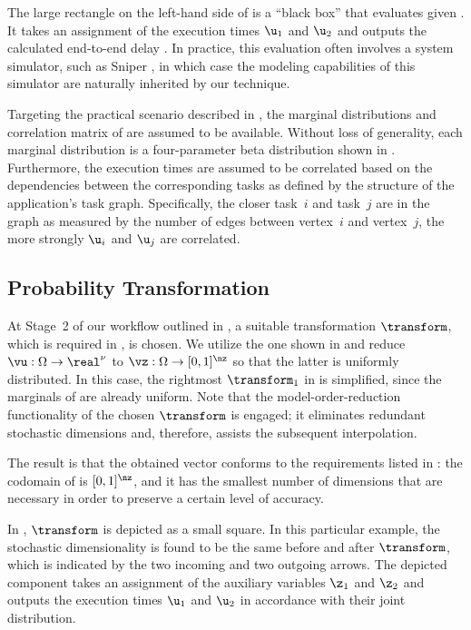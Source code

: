 The large rectangle on the left-hand side of  is a
``black box'' that evaluates \g given \vu. It takes an assignment of the
execution times $\u_1$ and $\u_2$ and outputs the calculated end-to-end delay
\g. In practice, this evaluation often involves a system simulator, such as
Sniper \cite{carlson2011}, in which case the modeling capabilities of this
simulator are naturally inherited by our technique.

Targeting the practical scenario described in , the
marginal distributions and correlation matrix of \vu are assumed to be
available. Without loss of generality, each marginal distribution is a
four-parameter beta distribution shown in . Furthermore,
the execution times are assumed to be correlated based on the dependencies
between the corresponding tasks as defined by the structure of the application's
task graph. Specifically, the closer task~$i$ and task~$j$ are in the graph as
measured by the number of edges between vertex~$i$ and vertex~$j$, the more
strongly $\u_i$ and $\u_j$ are correlated.

\subsection{Probability Transformation}

At Stage~2 of our workflow outlined in , a suitable
transformation $\transform$, which is required in ,
is chosen. We utilize the one shown in  and
reduce $\vu: \Omega \to \real^\nu$ to $\vz: \Omega \to [0, 1]^\nz$ so that the
latter is uniformly distributed. In this case, the rightmost $\transform_1$ in
 is simplified, since the marginals of \vz are
already uniform. Note that the model-order-reduction functionality of the chosen
$\transform$ is engaged; it eliminates redundant stochastic dimensions and,
therefore, assists the subsequent interpolation.

The result is that the obtained vector \vz conforms to the requirements listed
in : the codomain of \vz is $[0, 1]^\nz$, and it has
the smallest number of dimensions that are necessary in order to preserve a
certain level of accuracy.

In , $\transform$ is depicted as a small square. In this
particular example, the stochastic dimensionality is found to be the same before
and after $\transform$, which is indicated by the two incoming and two outgoing
arrows. The depicted component takes an assignment of the auxiliary variables
$\z_1$ and $\z_2$ and outputs the execution times $\u_1$ and $\u_2$ in
accordance with their joint distribution.

